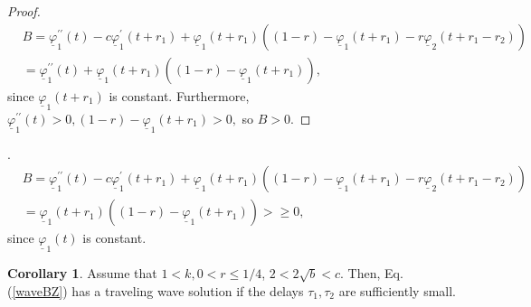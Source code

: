\documentclass[12pt,letterpaper]{amsart}
\theoremstyle{definition}
\newtheorem{corollary}[theorem]{Corollary}
\theoremstyle{remark}
\numberwithin{equation}{section}
\begin{document}
\begin{proof}
\begin{align*}
&B=\underline{\varphi}_{1}^{\prime\prime}(t)-c\underline{\varphi}_{1}^{\prime}(t+r_1)+\underline{\varphi}_{1}(t+r_1)\left(
(1-r)-\underline{\varphi}_{1}(t+r_1)-r\underline{\varphi}_{2}(t+r_1-r_2)\right) \\
&=\underline{\varphi}_{1}^{\prime\prime}(t)+\underline{\varphi}_{1}(t+r_1)\left(
(1-r)-\underline{\varphi}_{1}(t+r_1)\right),
\end{align*}
since $\underline{\varphi}_{1}(t+r_1)$ is constant. Furthermore, $\underline{\varphi}_{1}^{\prime\prime}(t)>0, (1-r)-\underline{\varphi}_{1}(t+r_1)>0,$ so $B> 0.$   
\end{proof}

\medskip {}.
\begin{align*}
&B=\underline{\varphi}_{1}^{\prime\prime}(t)-c\underline{\varphi}_{1}^{\prime}(t+r_1)+\underline{\varphi}_{1}(t+r_1)\left(
(1-r)-\underline{\varphi}_{1}(t+r_1)-r\underline{\varphi}_{2}(t+r_1-r_2)\right) \\
&=\underline{\varphi}_{1}(t+r_1)\left(
(1-r)-\underline{\varphi}_{1}(t+r_1)\right)>\ge 0,
\end{align*}
since $\underline{\varphi}_{1}(t)$ is constant. 
\begin{corollary}
Assume that $1<k, 0<r\le 1/4$, $2<2\sqrt{b} < c$. Then, Eq.(\ref{waveBZ}) has a traveling wave solution if the delays $\tau_1,\tau_2$ are sufficiently small.
\end{corollary}
\end{document}

